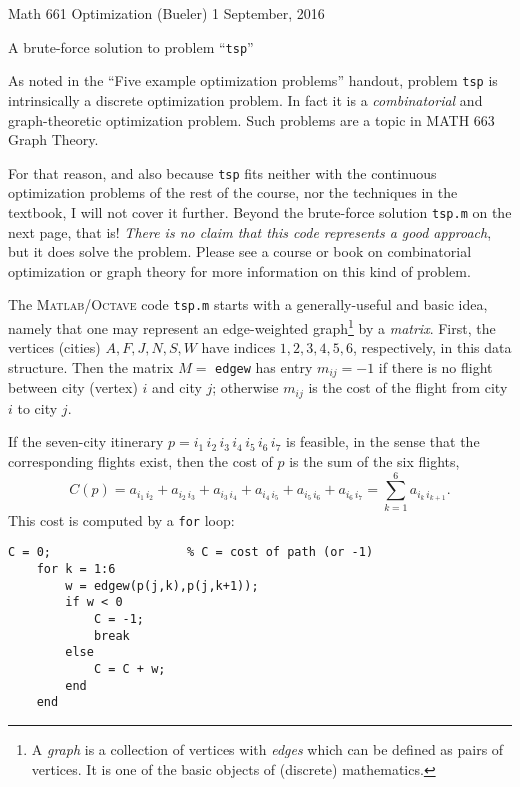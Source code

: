 \documentclass[11pt]{amsart}
\newcommand{\Matlab}{\textsc{Matlab}\xspace}
\newcommand{\Octave}{\textsc{Octave}\xspace}
\begin{document}
\scriptsize \noindent Math 661 Optimization (Bueler) \hfill 1 September, 2016
\normalsize

\medskip\bigskip
\Large
\centerline{A brute-force solution to problem ``\texttt{tsp}''}

\bigskip\medskip
\normalsize

\thispagestyle{empty}

As noted in the ``Five example optimization problems'' handout, problem \texttt{tsp} is intrinsically a discrete optimization problem.  In fact it is a \emph{combinatorial} and graph-theoretic optimization problem.  Such problems are a topic in MATH 663 Graph Theory.

For that reason, and also because \texttt{tsp} fits neither with the continuous optimization problems of the rest of the course, nor the techniques in the textbook, I will not cover it further.  Beyond the brute-force solution \texttt{tsp.m} on the next page, that is!  \emph{There is no claim that this code represents a good approach}, but it does solve the problem.  Please see a course or book on combinatorial optimization or graph theory for more information on this kind of problem.

The \Matlab/\Octave code \texttt{tsp.m} starts with a generally-useful and basic idea, namely that one may represent an edge-weighted graph\footnote{A \emph{graph} is a collection of vertices with \emph{edges} which can be defined as pairs of vertices.  It is one of the basic objects of (discrete) mathematics.} by a \emph{matrix}.  First, the vertices (cities) $A,F,J,N,S,W$ have indices $1,2,3,4,5,6$, respectively, in this data structure.  Then the matrix $M=$ \texttt{edgew} has entry $m_{ij}=-1$ if there is no flight between city (vertex) $i$ and city $j$; otherwise $m_{ij}$ is the cost of the flight from city $i$ to city $j$.

If the seven-city itinerary $p = i_1\,i_2\,i_3\,i_4\,i_5\,i_6\,i_7$ is feasible, in the sense that the corresponding flights exist, then the cost of $p$ is the sum of the six flights,
    $$C(p) = a_{i_1\, i_2} + a_{i_2\, i_3} + a_{i_3\, i_4} + a_{i_4\, i_5} + a_{i_5\, i_6} + a_{i_6\, i_7} = \sum_{k=1}^6 a_{i_k\,i_{k+1}}.$$
This cost is computed by a \texttt{for} loop:

\medskip
\begin{Verbatim}[fontfamily=courier,fontsize=\scriptsize]
    C = 0;                   % C = cost of path (or -1)
    for k = 1:6
        w = edgew(p(j,k),p(j,k+1));
        if w < 0
            C = -1;
            break
        else
            C = C + w;
        end
    end
\end{Verbatim}
\end{document}
